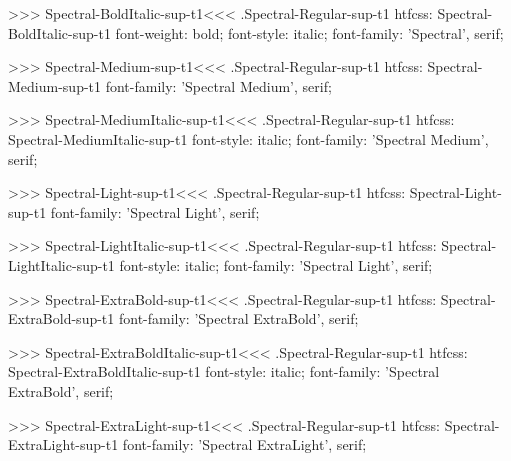 >>>
\<Spectral-BoldItalic-sup-t1\><<<
.Spectral-Regular-sup-t1
htfcss:  Spectral-BoldItalic-sup-t1  font-weight: bold; font-style: italic; font-family: 'Spectral', serif;

>>>
\<Spectral-Medium-sup-t1\><<<
.Spectral-Regular-sup-t1
htfcss:  Spectral-Medium-sup-t1  font-family: 'Spectral Medium', serif;

>>>
\<Spectral-MediumItalic-sup-t1\><<<
.Spectral-Regular-sup-t1
htfcss:  Spectral-MediumItalic-sup-t1  font-style: italic; font-family: 'Spectral Medium', serif;

>>>
\<Spectral-Light-sup-t1\><<<
.Spectral-Regular-sup-t1
htfcss:  Spectral-Light-sup-t1  font-family: 'Spectral Light', serif;

>>>
\<Spectral-LightItalic-sup-t1\><<<
.Spectral-Regular-sup-t1
htfcss:  Spectral-LightItalic-sup-t1  font-style: italic; font-family: 'Spectral Light', serif;

>>>
\<Spectral-ExtraBold-sup-t1\><<<
.Spectral-Regular-sup-t1
htfcss:  Spectral-ExtraBold-sup-t1  font-family: 'Spectral ExtraBold', serif;

>>>
\<Spectral-ExtraBoldItalic-sup-t1\><<<
.Spectral-Regular-sup-t1
htfcss:  Spectral-ExtraBoldItalic-sup-t1  font-style: italic; font-family: 'Spectral ExtraBold', serif;

>>>
\<Spectral-ExtraLight-sup-t1\><<<
.Spectral-Regular-sup-t1
htfcss:  Spectral-ExtraLight-sup-t1  font-family: 'Spectral ExtraLight', serif;

